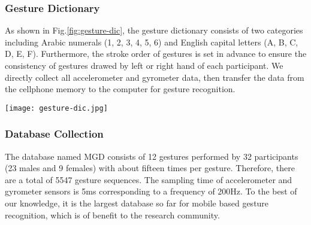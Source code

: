 \documentclass[review]{elsarticle}
\begin{document}
\subsubsection{Gesture Dictionary}
As shown in Fig.\;\ref{fig:gesture-dic}, the gesture dictionary consists of two categories including Arabic numerals (1, 2, 3, 4, 5, 6) and English capital letters (A, B, C, D, E, F). Furthermore, the stroke order of gestures is set in advance to ensure the consistency of gestures drawed by left or right hand of each participant.
We directly collect all accelerometer and gyrometer data, then transfer the data from the cellphone memory to the computer for gesture recognition.

\begin{figure*}[htbp]
	\normalsize
	\centering
	\texttt{[image: gesture-dic.jpg]}
	\caption{Examples of hand gestures in \textbf{{MGD} database}.}
	\label{fig:gesture-dic}%
	\vspace*{4pt}
\end{figure*}

\subsubsection{Database Collection} The database named MGD consists of 12 gestures performed by 32 participants (23 males and 9 females) with about fifteen times per gesture. Therefore, there are a total of 5547 gesture sequences. The sampling time of accelerometer and gyrometer sensors is 5ms corresponding to a frequency of 200Hz. To the best of our knowledge, it is the largest database so far for mobile based gesture recognition, {which is of benefit to the research community}.

\end{document}
